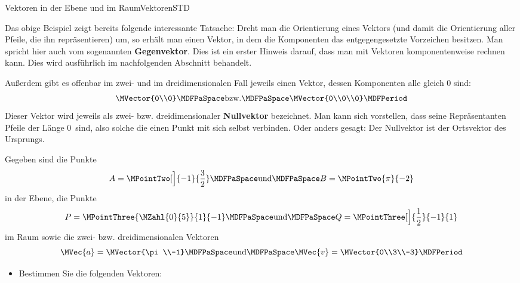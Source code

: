 \begin{MXContent}{Vektoren in der Ebene und im Raum}{Vektoren}{STD}
\begin{MExample}
\end{MExample}

Das obige Beispiel zeigt bereits folgende interessante Tatsache: Dreht man die Orientierung eines Vektors (und damit die Orientierung aller Pfeile, die ihn repräsentieren) um, so erhält man einen Vektor, in dem die Komponenten das entgegengesetzte Vorzeichen besitzen. Man spricht hier auch vom sogenannten \textbf{Gegenvektor}. Dies ist ein erster Hinweis darauf, dass man mit Vektoren komponentenweise rechnen kann. Dies wird ausführlich im nachfolgenden Abschnitt  behandelt.  

Außerdem gibt es offenbar im zwei- und im dreidimensionalen Fall jeweils einen Vektor, dessen Komponenten alle gleich $0$ sind:
\[
 \MVector{0\\0}\MDFPaSpace\textrm{bzw.}\MDFPaSpace\MVector{0\\0\\0}\MDFPeriod
\]
Dieser Vektor wird jeweils als zwei- bzw. dreidimensionaler \textbf{Nullvektor} bezeichnet. Man kann sich vorstellen, dass seine Repräsentanten \glqq Pfeile der Länge $0$\grqq\ sind, also solche die einen Punkt mit sich selbst verbinden. Oder anders gesagt: Der Nullvektor ist der Ortsvektor des Ursprungs.

\begin{MExercise}
Gegeben sind die Punkte
\[
 A=\MPointTwo[\Big]{-1}{\frac{3}{2}}\MDFPaSpace\textrm{und}\MDFPaSpace B=\MPointTwo{\pi}{-2}
\]
in der Ebene, die Punkte
\[
 P=\MPointThree{\MZahl{0}{5}}{1}{-1}\MDFPaSpace\textrm{und}\MDFPaSpace Q=\MPointThree[\Big]{\frac{1}{2}}{-1}{1}
\]
im Raum sowie die zwei- bzw. dreidimensionalen Vektoren
\[
 \MVec{a}=\MVector{\pi\\-1}\MDFPaSpace\textrm{und}\MDFPaSpace \MVec{v}=\MVector{0\\3\\-3} \MDFPeriod
\]
\begin{itemize}
 \item Bestimmen Sie die folgenden Vektoren:\\


\end{itemize}
\end{MExercise}
\end{MXContent}

